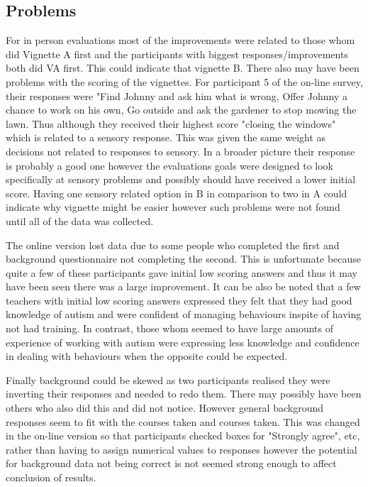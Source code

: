 \documentclass[11pt]{report}
\begin{document}
\subsection*{Problems}
For in person evaluations most of the improvements were related to those whom did Vignette A first and the participants with biggest responses/improvements both did VA first. This could indicate that vignette B. There also may have been problems with the scoring of the vignettes. For participant 5 of the on-line survey, their responses were "Find Johnny and ask him what is wrong, Offer Johnny a chance to work on his own, Go outside and ask the gardener to stop mowing the lawn. Thus although they received their highest score "closing the windows" which is related to a sensory response. This was given the same weight as decisions not related to responses to sensory. In a broader picture their response is probably a good one however the evaluations goals were designed to look specifically at sensory problems and possibly should have received a lower initial score. Having one sensory related option in B in comparison to two in A could indicate why vignette might be easier however such problems were not found until all of the data was collected. 

The online version lost data due to some people who completed the first and background questionnaire not completing the second. This is unfortunate because quite a few of these participants gave initial low scoring answers and thus it may have been seen there was a large improvement. It can be also be noted that a few teachers with initial low scoring answers expressed they felt that they had good knowledge of autism and were confident of managing behaviours inspite of having not had training. In contrast, those whom seemed to have large amounts of experience of working with autism were expressing less knowledge and confidence in dealing with behaviours when the opposite could be expected. 

Finally background could be skewed as two participants realised they were inverting their responses and needed to redo them. There may possibly have been others who also did this and did not notice. However general background responses seem to fit with the courses taken and courses taken. This was changed in the on-line version so that participants checked boxes for "Strongly agree", etc, rather than having to assign numerical values to responses however the potential for background data not being correct is not seemed strong enough to affect conclusion of results. 
\end{document}
